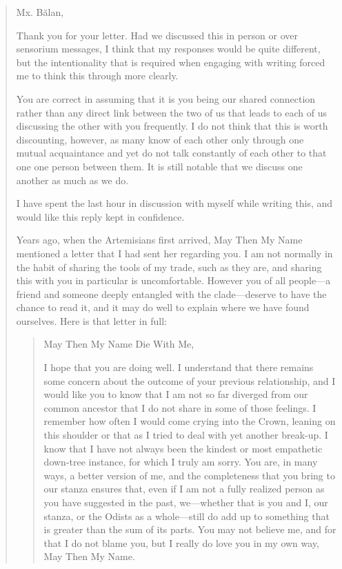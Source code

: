 \begin{quote}
Mx. Bălan,

Thank you for your letter. Had we discussed this in person or over sensorium messages, I think that my responses would be quite different, but the intentionality that is required when engaging with writing forced me to think this through more clearly.

You are correct in assuming that it is you being our shared connection rather than any direct link between the two of us that leads to each of us discussing the other with you frequently. I do not think that this is worth discounting, however, as many know of each other only through one mutual acquaintance and yet do not talk constantly of each other to that one one person between them. It is still notable that we discuss one another as much as we do.

I have spent the last hour in discussion with myself while writing this, and would like this reply kept in confidence.

Years ago, when the Artemisians first arrived, May Then My Name mentioned a letter that I had sent her regarding you. I am not normally in the habit of sharing the tools of my trade, such as they are, and sharing this with you in particular is uncomfortable. However you of all people—a friend and someone deeply entangled with the clade—deserve to have the chance to read it, and it may do well to explain where we have found ourselves. Here is that letter in full:

\begin{quote}
May Then My Name Die With Me,

I hope that you are doing well. I understand that there remains some concern about the outcome of your previous relationship, and I would like you to know that I am not so far diverged from our common ancestor that I do not share in some of those feelings. I remember how often I would come crying into the Crown, leaning on this shoulder or that as I tried to deal with yet another break-up. I know that I have not always been the kindest or most empathetic down-tree instance, for which I truly am sorry. You are, in many ways, a better version of me, and the completeness that you bring to our stanza ensures that, even if I am not a fully realized person as you have suggested in the past, we—whether that is you and I, our stanza, or the Odists as a whole—still do add up to something that is greater than the sum of its parts. You may not believe me, and for that I do not blame you, but I really do love you in my own way, May Then My Name.


\end{quote}
\end{quote}
